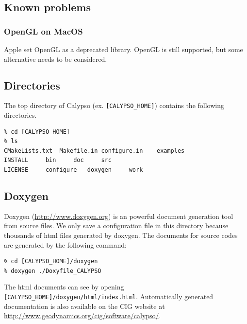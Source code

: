 \subsection{Known problems}
\subsubsection*{OpenGL on MacOS}
Apple set OpenGL as a deprecated library. OpenGL is still supported, but some alternative needs to be considered.

\subsection{Directories}

The top directory of Calypso (ex. \verb|[CALYPSO_HOME]|) contains the following directories.
\begin{verbatim}
% cd [CALYPSO_HOME]
% ls
CMakeLists.txt	Makefile.in	configure.in	examples
INSTALL		bin		doc		src
LICENSE		configure	doxygen		work

\end{verbatim}


\subsection{Doxygen}
Doxygen (\url{http://www.doxygen.org}) is an powerful document generation tool from source files. We only save a configuration file in this directory because thousands of html files generated by doxygen. The documents for source codes are generated by the following command:
% 
\begin{verbatim}
% cd [CALYPSO_HOME]/doxygen
% doxygen ./Doxyfile_CALYPSO
\end{verbatim}
%
The html documents can see by opening \verb|[CALYPSO_HOME]/doxygen/html/index.html|.  Automatically generated documentation is also available on the CIG website at \url{http://www.geodynamics.org/cig/software/calypso/}.

